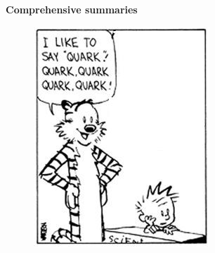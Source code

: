 \cleardoublepage\thispagestyle{empty}

\begin{center}
	\vspace*{10mm}
     
	\huge \textbf{Comprehensive summaries}

	\vspace{10mm}
\begin{figure}[th]
	\centering
	\includegraphics[width=0.5\linewidth]{./quark}
\end{figure}
\vspace{10mm}



\end{center}

\cleardoublepage
\setlength{\topmargin}{0mm}
\normalsize%